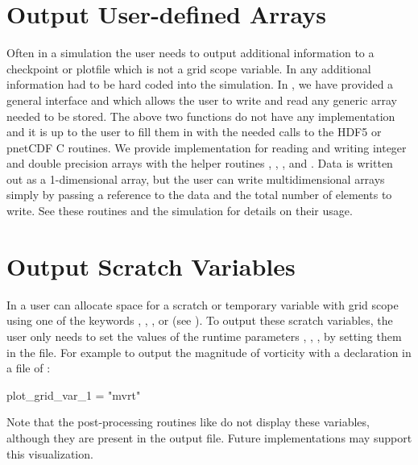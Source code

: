 \section{Output User-defined Arrays}
\label{Sec: Output user defined arrays}

Often in a simulation the user needs to output additional information to a checkpoint or plotfile
which is not a grid scope variable.  In \flashx any additional information had to be hard coded
into the simulation.  In \flashx, we have provided a general interface 
and  which allows the user to write and read any generic array needed to
be stored.  The above two functions do not have any implementation and it is up to the user to
fill them in with the needed calls to the HDF5 or pnetCDF C routines.  We provide implementation
for reading and writing integer and double precision arrays with the helper routines
, , , and
.  Data is written
out as a 1-dimensional array, but the user can write multidimensional arrays simply by passing a
reference to the data and the total number of elements to write. See these
routines and the simulation  for details on their usage.


\section{Output Scratch Variables}
\label{lbl:OutputScratchVariables}
In \flashx a user can allocate space for a scratch or temporary
variable with grid scope using one of the
 keywords , ,
, or
 (see ). 
To output these scratch variables, the user
only needs to set the values of the runtime parameters
,
, \etc, by
setting them in the  file.
For example to output the magnitude of vorticity
with a declaration in a  file of :
\begin{codeseg}
plot_grid_var_1 = "mvrt"
\end{codeseg}
Note that the post-processing routines like  do not display these variables,
although they are present in the output file.  Future implementations may support this visualization.

